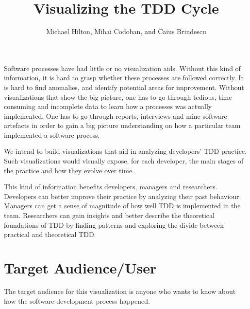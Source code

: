\documentclass[journal]{vgtc}                %
\title{Visualizing the TDD Cycle}
\author{Michael Hilton, Mihai Codoban, and Caius Brindescu}
\begin{document}


\maketitle


Software processes have had little or no visualization aids.
Without this kind of information, it is hard to grasp whether these processes are followed correctly. It is hard to find anomalies, and identify potential areas for improvement. Without visualizations that show the big picture, one has to go through tedious, time consuming and incomplete data to learn how a processes was actually implemented. One has to go through reports, interviews and mine software artefacts in order to gain a big picture understanding on how a particular team implemented a software process.

We intend to build visualizations that aid in analyzing developers' TDD practice. Such visualizations would visually expose, for each developer, the main stages of the practice and how they evolve over time.

This kind of information benefits developers, managers and researchers. Developers can better improve their practice by analyzing their past behaviour. Managers can get a sense of magnitude of how well TDD is implemented in the team. Researchers can gain insights and better describe the theoretical foundations of TDD by finding patterns and exploring the divide between practical and theoretical TDD.

\section{Target Audience/User}

The target audience for this visualization is anyone who wants to know about how the software development process happened.  
\end{document}
